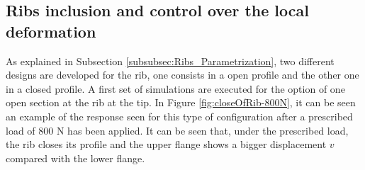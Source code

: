   \clearpage
  \subsection{Ribs inclusion and control over the local deformation} \label{subsec:ribs_results_model}

    As explained in Subsection \ref{subsubsec:Ribs_Parametrization}, two different designs are developed for the rib, one consists in a open profile and the other one in a closed profile. A first set of simulations are executed for the option of one open section at the rib at the tip. In Figure \ref{fig:closeOfRib-800N}, it can be seen an example of the response seen for this type of configuration after a prescribed load of 800 N has been applied. It can be seen that, under the prescribed load, the rib closes its profile and the upper flange shows a bigger displacement $v$ compared with the lower flange.

